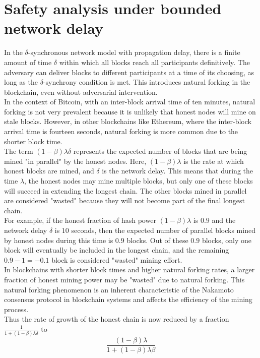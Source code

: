 \section{Safety analysis under bounded network delay}
In the $\delta$-synchronous network model with propagation delay, there is a finite amount of time $\delta$ within which all blocks reach all participants definitively. The adversary can deliver blocks to different participants at a time of its choosing, as long as the $\delta$-synchrony condition is met. This introduces natural forking in the blockchain, even without adversarial intervention.\\
In the context of Bitcoin, with an inter-block arrival time of ten minutes, natural forking is not very prevalent because it is unlikely that honest nodes will mine on stale blocks. However, in other blockchains like Ethereum, where the inter-block arrival time is fourteen seconds, natural forking is more common due to the shorter block time.\\
The term $(1 - \beta)\lambda\delta$ represents the expected number of blocks that are being mined "in parallel" by the honest nodes. Here, $(1 - \beta)\lambda$ is the rate at which honest blocks are mined, and $\delta$ is the network delay. This means that during the time $\lambda$, the honest nodes may mine multiple blocks, but only one of these blocks will succeed in extending the longest chain. The other blocks mined in parallel are considered "wasted" because they will not become part of the final longest chain.\\
For example, if the honest fraction of hash power $(1 - \beta)\lambda$ is $0.9$ and the network delay $\delta$ is $10$ seconds, then the expected number of parallel blocks mined by honest nodes during this time is $0.9$ blocks. Out of these $0.9$ blocks, only one block will eventually be included in the longest chain, and the remaining $0.9 - 1 = -0.1$ block is considered "wasted" mining effort.\\
In blockchains with shorter block times and higher natural forking rates, a larger fraction of honest mining power may be "wasted" due to natural forking. This natural forking phenomenon is an inherent characteristic of the Nakamoto consensus protocol in blockchain systems and affects the efficiency of the mining process.\\
Thus the rate of growth of the honest chain is now reduced by a fraction $\frac{1}{1+(1 - \beta)\lambda\delta}$ to
\begin{equation*}
	\frac{(1 - \beta) \lambda}{1 + (1 - \beta) \lambda \beta}
\end{equation*}
